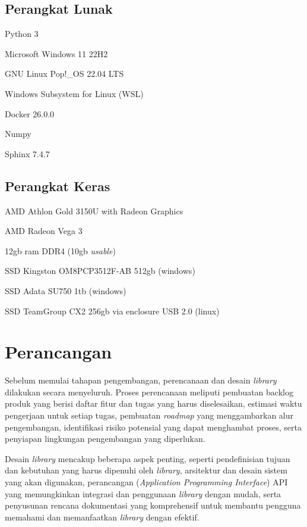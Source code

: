 \subsection{Perangkat Lunak}
\begin{packed_enum}
  \item Python 3
  \item Microsoft Windows 11 22H2
  \item GNU Linux Pop!\_OS 22.04 LTS
  \item Windows Subsystem for Linux (WSL)
  \item Docker 26.0.0
  \item Numpy
  \item Sphinx 7.4.7
\end{packed_enum}

\subsection{Perangkat Keras}
\begin{packed_enum}
  \item AMD Athlon Gold 3150U with Radeon Graphics
  \item AMD Radeon Vega 3
  \item 12gb ram DDR4 (10gb \textit{usable})
  \item SSD Kingston OM8PCP3512F-AB 512gb (windows)
  \item SSD Adata SU750 1tb (windows)
  \item SSD TeamGroup CX2 256gb via enclosure USB 2.0 (linux)
\end{packed_enum}

\section{Perancangan}
Sebelum memulai tahapan pengembangan, perencanaan dan desain \textit{library} dilakukan secara menyeluruh. Proses perencanaan meliputi pembuatan backlog produk yang berisi daftar fitur dan tugas yang harus diselesaikan, estimasi waktu pengerjaan untuk setiap tugas, pembuatan \textit{roadmap} yang menggambarkan alur pengembangan, identifikasi risiko potensial yang dapat menghambat proses, serta penyiapan lingkungan pengembangan yang diperlukan.

Desain \textit{library} mencakup beberapa aspek penting, seperti pendefinisian tujuan dan kebutuhan yang harus dipenuhi oleh \textit{library}, arsitektur dan desain sistem yang akan digunakan, perancangan (\textit{Application Programming Interface}) API yang memungkinkan integrasi dan penggunaan \textit{library} dengan mudah, serta penyusunan rencana dokumentasi yang komprehensif untuk membantu pengguna memahami dan memanfaatkan \textit{library} dengan efektif.

